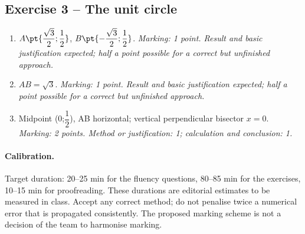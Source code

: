 \subsection*{Exercise 3 -- The unit circle}
\begin{enumerate}
\item $A\pt{\dfrac{\sqrt 3}{2};\dfrac{1}{2}}$, $B\pt{-\dfrac{\sqrt 3}{2};\dfrac{1}{2}}$. \textit{Marking: 1 point. Result and basic justification expected; half a point possible for a correct but unfinished approach.}
\item $AB=\sqrt3$. \textit{Marking: 1 point. Result and basic justification expected; half a point possible for a correct but unfinished approach.}
\item Midpoint (0;$\dfrac{1}{2}$), AB horizontal; vertical perpendicular bisector $x=0$. \textit{Marking: 2 points. Method or justification: 1; calculation and conclusion: 1.}
\end{enumerate}
\paragraph{Calibration.} Target duration: 20--25 min for the fluency questions, 80--85 min for the exercises, 10--15 min for proofreading. These durations are editorial estimates to be measured in class. Accept any correct method; do not penalise twice a numerical error that is propagated consistently. The proposed marking scheme is not a decision of the team to harmonise marking.
